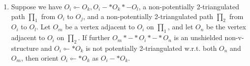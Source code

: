 \documentclass[twoside, 11pt]{article}
\begin{document}
\begin{appendices}
\begin{algorithm}
\begin{algorithmic}[1]
\begin{enumerate}[nolistsep, label=(\roman*)]
    \item Suppose we have $O_i \multimapinv O_k, O_i -* O_k *- O_l$, a non-potentially 2-triangulated path $\prod_1$ from $O_i$ to $O_j$, and a non-potentially 2-triangulated path $\prod_2$ from $O_i$ to $O_l$. Let $O_m$ be a vertex adjacent to $O_i$ on $\prod_1$, and let $O_n$ be the vertex adjacent to $O_i$ on $\prod_2$. If further $O_m *-* O_i *-* O_n$ is an unshielded non-v-structure and $O_i \multimapinv * O_k$ is not potentially 2-triangulated w.r.t. both $O_n$ and $O_m$, then orient $O_i \multimapinv * O_k$ as $O_i -* O_k$.

    
\end{enumerate}


\end{algorithmic}
\end{algorithm}

\end{appendices}
\end{document}
